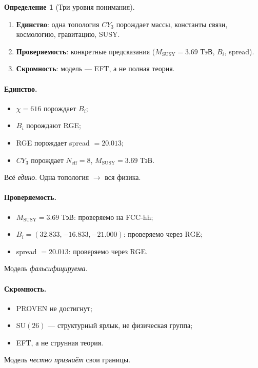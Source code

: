 \documentclass[11pt,a4paper]{article}
\newcommand{\SU}{\mathrm{SU}}
\newcommand{\CY}{CY_3}
\newcommand{\Neff}{N_{\text{eff}}}
\newcommand{\MSUSY}{M_{\text{SUSY}}}
\theoremstyle{definition}
\newtheorem{definition}[theorem]{Определение}
\begin{document}
\begin{definition}[Три уровня понимания]
\label{def:three-understanding}
\begin{enumerate}
    \item \textbf{Единство}: одна топология $\CY$ порождает 
          массы, константы связи, космологию, гравитацию, SUSY.
    \item \textbf{Проверяемость}: конкретные предсказания 
          ($\MSUSY = 3.69$ ТэВ, $B_i$, spread).
    \item \textbf{Скромность}: модель — EFT, а не полная теория.
\end{enumerate}
\end{definition}

\paragraph{Единство.}
\begin{itemize}
    \item $\chi = 616$ порождает $B_i$;
    \item $B_i$ порождают RGE;
    \item RGE порождает spread $= 20.013$;
    \item $\CY$ порождает $\Neff = 8$, $\MSUSY = 3.69$ ТэВ.
\end{itemize}
Всё \emph{едино}. Одна топология $\to$ вся физика.

\paragraph{Проверяемость.}
\begin{itemize}
    \item $\MSUSY = 3.69$ ТэВ: проверяемо на FCC-hh;
    \item $B_i = (32.833, -16.833, -21.000)$: проверяемо через RGE;
    \item spread $= 20.013$: проверяемо через RGE.
\end{itemize}
Модель \emph{фальсифицируема}.

\paragraph{Скромность.}
\begin{itemize}
    \item PROVEN не достигнут;
    \item $\SU(26)$ — структурный ярлык, не физическая группа;
    \item EFT, а не струнная теория.
\end{itemize}
Модель \emph{честно признаёт} свои границы.
\end{document}
